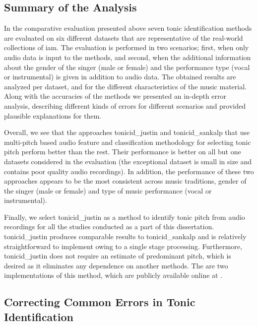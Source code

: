 {\subsection{Summary of the Analysis }
\label{sec:pre_processing_tonic_identification_summary}

In the comparative evaluation presented above seven tonic identification methods are evaluated on six different datasets that are representative of the real-world collections of \gls{iam}. The evaluation is performed in two scenarios; first, when only audio data is input to the methods, and second, when the additional information about the gender of the singer (male or female) and  the performance type (vocal or instrumental) is given in addition to audio data. The obtained results are analyzed per dataset, and for the different characteristics of the music material. Along with the accuracies of the methods we presented an in-depth error analysis, describing different kinds of errors for different scenarios and provided plausible explanations for them.

Overall, we see that the approaches \acrshort{tonicid_justin} and \acrshort{tonicid_sankalp} that use multi-pitch based audio feature and classification methodology for selecting tonic pitch perform better than the rest. Their performance is better on all but one datasets considered in the evaluation (the exceptional dataset is small in size and contains poor quality audio recordings). In addition, the performance of these two approaches appears to be the most consistent across music traditions, gender of the singer (male or female) and type of music performance (vocal or instrumental). 

Finally, we select \acrshort{tonicid_justin} as a method to identify tonic pitch from audio recordings for all the studies conducted as a part of this dissertation. \acrshort{tonicid_justin} produces comparable results to \acrshort{tonicid_sankalp} and is relatively straightforward to implement owing to a single stage processing. Furthermore, \acrshort{tonicid_justin} does not require an estimate of predominant pitch, which is desired as it eliminates any dependence on another methods. The are two implementations of this method, which are publicly available online at . 


\subsection{Correcting Common Errors in Tonic Identification}
\label{sec:pre_processing_tonic_identification_correcting_errors}

}
